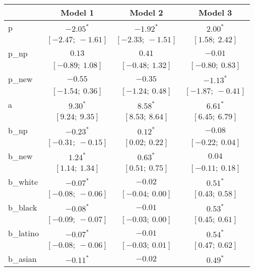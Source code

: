 
\begin{table}
\begin{center}
\begin{tabular}{l c c c }
\hline
 & Model 1 & Model 2 & Model 3 \\
\hline
p         & $-2.05^{*}$             & $-1.92^{*}$             & $2.00^{*}$            \\
          & $[-2.47;\ -1.61]$       & $[-2.33;\ -1.51]$       & $[1.58;\ 2.42]$       \\
p\_np     & $0.13$                  & $0.41$                  & $-0.01$               \\
          & $[-0.89;\ 1.08]$        & $[-0.48;\ 1.32]$        & $[-0.80;\ 0.83]$      \\
p\_new    & $-0.55$                 & $-0.35$                 & $-1.13^{*}$           \\
          & $[-1.54;\ 0.36]$        & $[-1.24;\ 0.48]$        & $[-1.87;\ -0.41]$     \\
a         & $9.30^{*}$              & $8.58^{*}$              & $6.61^{*}$            \\
          & $[9.24;\ 9.35]$         & $[8.53;\ 8.64]$         & $[6.45;\ 6.79]$       \\
b\_np     & $-0.23^{*}$             & $0.12^{*}$              & $-0.08$               \\
          & $[-0.31;\ -0.15]$       & $[0.02;\ 0.22]$         & $[-0.22;\ 0.04]$      \\
b\_new    & $1.24^{*}$              & $0.63^{*}$              & $0.04$                \\
          & $[1.14;\ 1.34]$         & $[0.51;\ 0.75]$         & $[-0.11;\ 0.18]$      \\
b\_white  & $-0.07^{*}$             & $-0.02$                 & $0.51^{*}$            \\
          & $[-0.08;\ -0.06]$       & $[-0.04;\ 0.00]$        & $[0.43;\ 0.58]$       \\
b\_black  & $-0.08^{*}$             & $-0.01$                 & $0.53^{*}$            \\
          & $[-0.09;\ -0.07]$       & $[-0.03;\ 0.00]$        & $[0.45;\ 0.61]$       \\
b\_latino & $-0.07^{*}$             & $-0.01$                 & $0.54^{*}$            \\
          & $[-0.08;\ -0.06]$       & $[-0.03;\ 0.01]$        & $[0.47;\ 0.62]$       \\
b\_asian  & $-0.11^{*}$             & $-0.02$                 & $0.49^{*}$            \\

\end{tabular}
\end{center}
\end{table}
